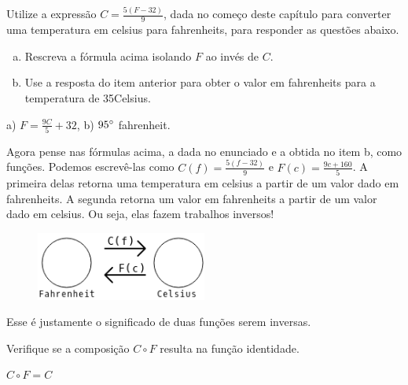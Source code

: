 \documentclass[main.tex]{subfiles}
\begin{document}
\begin{questao}
Utilize a expressão $C=\frac{5(F-32)}{9}$, dada no começo deste capítulo para converter uma temperatura em celsius para fahrenheits, para responder as questões abaixo.
\begin{enumerate}[a)]
\item Rescreva a fórmula acima isolando $F$ ao invés de $C$.
\item Use a resposta do item anterior para obter o valor em fahrenheits para a temperatura de 35\degree Celsius.
\end{enumerate}
\end{questao}

\begin{gabarito}
	\begin{gabaritoQuestao}
		a) $F=\frac{9C}{5}+32$, b) $95\degree$ fahrenheit.
	\end{gabaritoQuestao}
\end{gabarito}

Agora pense nas fórmulas acima, a dada no enunciado e a obtida no item b, como funções. Podemos escrevê-las como $C(f)=\frac{5(f-32)}{9}$ e $F(c)=\frac{9c+160}{5}$. A primeira delas retorna uma temperatura em celsius a partir de um valor dado em fahrenheits. A segunda retorna um valor em fahrenheits a partir de um valor dado em celsius. Ou seja, elas fazem trabalhos inversos!

\begin{figure}[h]
\centering
\includegraphics[width=0.5\textwidth]{./img/c5q9.png}
\end{figure}

Esse é justamente o significado de duas funções serem inversas. 

\begin{questao}
Verifique se a composição $C \circ F$ resulta na função identidade.
\end{questao}


\begin{gabarito}
	\begin{gabaritoQuestao}
		$C \circ F=C$
	\end{gabaritoQuestao}
\end{gabarito}
\end{document}
